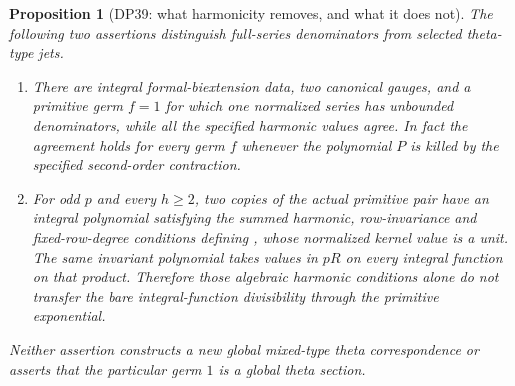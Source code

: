 \documentclass[11pt,a4paper]{article}
\newtheorem{proposition}[theorem]{Proposition}
\theoremstyle{definition}\newtheorem{remark}[theorem]{Remark}
\begin{document}
\begin{proposition}[DP39: what harmonicity removes, and what it does not]\label{DP39}
The following two assertions distinguish full-series denominators from selected theta-type jets.
\begin{enumerate}[leftmargin=*,label=(\alph*)]
\item There are integral formal-biextension data, two canonical gauges, and a primitive germ $f=1$ for which one normalized series has unbounded denominators, while all the specified harmonic values agree. In fact the agreement holds for every germ $f$ whenever the polynomial $P$ is killed by the specified second-order contraction.
\item For odd $p$ and every $h\ge2$, two copies of the actual primitive pair have an integral polynomial satisfying the summed harmonic, row-invariance and fixed-row-degree conditions defining , whose normalized kernel value is a unit. The same invariant polynomial takes values in $pR$ on every integral function on that product. Therefore those algebraic harmonic conditions alone do not transfer the bare integral-function divisibility through the primitive exponential.
\end{enumerate}
Neither assertion constructs a new global mixed-type theta correspondence or asserts that the particular germ $1$ is a global theta section.
\end{proposition}
\end{document}
